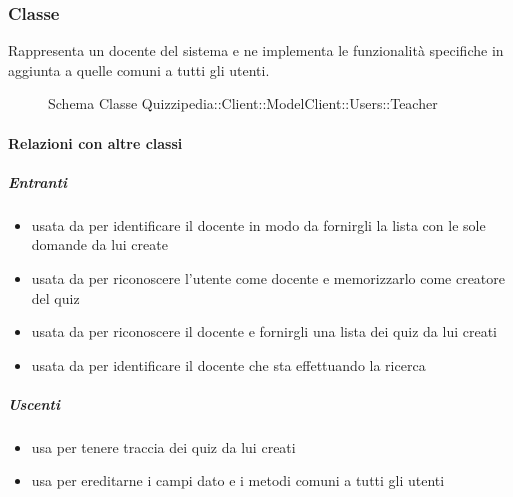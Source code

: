 \subsubsection{Classe }
Rappresenta un docente del sistema e ne implementa le funzionalità specifiche in aggiunta a quelle comuni a tutti gli utenti.
\begin{figure}[H]
\centering
\noindent{}
\caption[Schema Classe Teacher]{Schema Classe Quizzipedia::Client::ModelClient::Users::Teacher}
\end{figure}
\paragraph{Relazioni con altre classi}
\subparagraph{Entranti}
\begin{itemize}
\item usata da  per identificare il docente in modo da fornirgli la lista con le sole domande da lui create
\item usata da  per riconoscere l'utente come docente e memorizzarlo come creatore del quiz
\item usata da  per riconoscere il docente e fornirgli una lista dei quiz da lui creati
\item usata da  per identificare il docente che sta effettuando la ricerca
\end{itemize}
\subparagraph{Uscenti}
\begin{itemize}
\item usa  per tenere traccia dei quiz da lui creati
\item usa  per ereditarne i campi dato e i metodi comuni a tutti gli utenti
\end{itemize}
